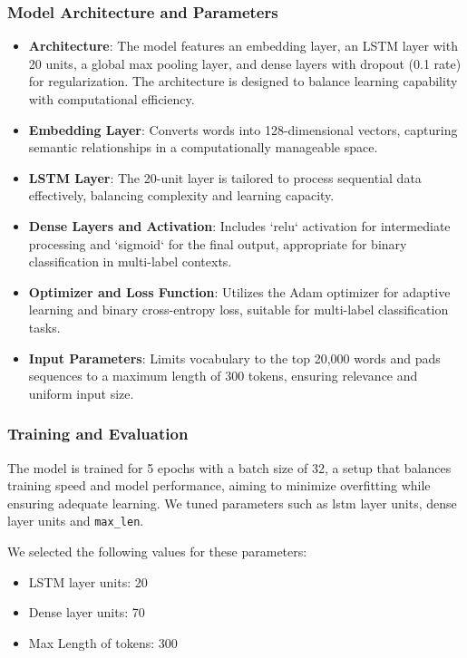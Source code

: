 \subsubsection{Model Architecture and Parameters}
\begin{itemize}
    \item \textbf{Architecture}: The model features an embedding layer, an LSTM layer with 20 units, a global max pooling layer, and dense layers with dropout (0.1 rate) for regularization. The architecture is designed to balance learning capability with computational efficiency.
    \item \textbf{Embedding Layer}: Converts words into 128-dimensional vectors, capturing semantic relationships in a computationally manageable space.
    \item \textbf{LSTM Layer}: The 20-unit layer is tailored to process sequential data effectively, balancing complexity and learning capacity.
    \item \textbf{Dense Layers and Activation}: Includes `relu` activation for intermediate processing and `sigmoid` for the final output, appropriate for binary classification in multi-label contexts.
    \item \textbf{Optimizer and Loss Function}: Utilizes the Adam optimizer for adaptive learning and binary cross-entropy loss, suitable for multi-label classification tasks.
    \item \textbf{Input Parameters}: Limits vocabulary to the top 20,000 words and pads sequences to a maximum length of 300 tokens, ensuring relevance and uniform input size.
\end{itemize}


\subsubsection{Training and Evaluation}
The model is trained for 5 epochs with a batch size of 32, a setup that balances training speed and model performance, aiming to minimize overfitting while ensuring adequate learning. We tuned parameters such as lstm layer units, dense layer units and \texttt{max\_len}.

We selected the following values for these parameters:
\begin{itemize}
    \item LSTM layer units: 20
    \item Dense layer units: 70
    \item Max Length of tokens: 300
\end{itemize}

